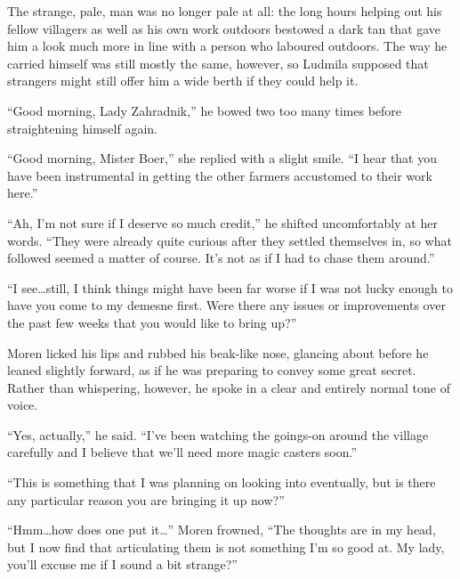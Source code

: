  

The strange, pale, man was no longer pale at all: the long hours helping out his fellow villagers as well as his own work outdoors bestowed a dark tan that gave him a look much more in line with a person who laboured outdoors. The way he carried himself was still mostly the same, however, so Ludmila supposed that strangers might still offer him a wide berth if they could help it.

 

“Good morning, Lady Zahradnik,” he bowed two too many times before straightening himself again.

 

“Good morning, Mister Boer,” she replied with a slight smile. “I hear that you have been instrumental in getting the other farmers accustomed to their work here.”

 

“Ah, I’m not sure if I deserve so much credit,” he shifted uncomfortably at her words. “They were already quite curious after they settled themselves in, so what followed seemed a matter of course. It’s not as if I had to chase them around.”

 

“I see…still, I think things might have been far worse if I was not lucky enough to have you come to my demesne first. Were there any issues or improvements over the past few weeks that you would like to bring up?”

 

Moren licked his lips and rubbed his beak-like nose, glancing about before he leaned slightly forward, as if he was preparing to convey some great secret. Rather than whispering, however, he spoke in a clear and entirely normal tone of voice.

 

“Yes, actually,” he said. “I’ve been watching the goings-on around the village carefully and I believe that we’ll need more magic casters soon.”

 

“This is something that I was planning on looking into eventually, but is there any particular reason you are bringing it up now?”

 

“Hmm…how does one put it…” Moren frowned, “The thoughts are in my head, but I now find that articulating them is not something I’m so good at. My lady, you’ll excuse me if I sound a bit strange?”

 

